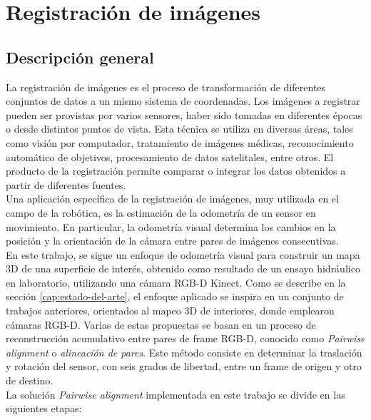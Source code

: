 
\chapter{Registración de imágenes}

\section{Descripción general}
\label{sec:descripcion-general-registracion}

La registración de imágenes es el proceso de transformación de diferentes conjuntos de datos a un mismo sistema de coordenadas. Los imágenes a registrar pueden ser provistas por varios sensores, haber sido tomadas en diferentes épocas o desde distintos puntos de vista. Esta técnica se utiliza en diversas áreas, tales como visión por computador, tratamiento de imágenes médicas, reconocimiento automático de objetivos, procesamiento de datos satelitales, entre otros. El producto de la registración permite comparar o integrar los datos obtenidos a partir de diferentes fuentes. \\
Una aplicación específica de la registración de imágenes, muy utilizada en el campo de la robótica, es la estimación de la odometría de un sensor en movimiento. En particular, la odometría visual determina los cambios en la posición y la orientación de la cámara entre pares de imágenes consecutivas. \\
En este trabajo, se sigue un enfoque de odometría visual para construir un mapa 3D de una superficie de interés, obtenido como resultado de un ensayo hidráulico en laboratorio, utilizando una cámara RGB-D Kinect. Como se describe en la sección \ref{cap:estado-del-arte}, el enfoque aplicado se inspira en un conjunto de trabajos anteriores, orientados al mapeo 3D de interiores, donde emplearon cámaras RGB-D. Varias de estas propuestas se basan en un proceso de reconstrucción acumulativo entre pares de frame RGB-D, conocido como \textit{Pairwise alignment} o \textit{alineación de pares}. Este método consiste en determinar la traslación y rotación del sensor, con seis grados de libertad, entre un frame de origen y otro de destino. \\
La solución \textit{Pairwise alignment} implementada en este trabajo se divide en las siguientes etapas:
